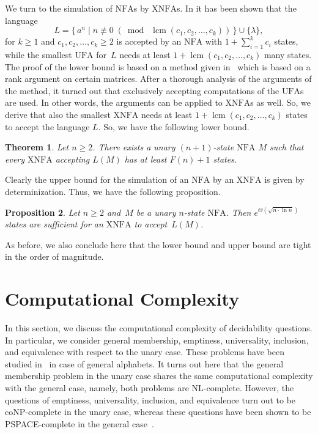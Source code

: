 \documentclass[final,copyright,noderivs]{eptcs}
\theoremstyle{plain}
\newtheorem{theorem}{Theorem}
\newtheorem{proposition}[theorem]{Proposition}
\theoremstyle{definition}
\DeclareMathOperator{\lcm}{lcm}
\newcommand{\ufa}{\textrm{UFA}}
\newcommand{\nfa}{\textrm{NFA}}
\newcommand{\xnfa}{\textrm{XNFA}}
\begin{document}
We turn to the simulation of $\nfa$s by $\xnfa$s.
In \cite{okhotin:2012:ufau} it has been shown that the language
$$
L=\{\, a^n\mid n\not\equiv 0\; (\bmod\; \lcm(c_1,c_2,\dots, c_k)) \,\}\cup \{\lambda\},
$$
for $k\ge 1$ and $c_1,c_2,\dots ,c_k\geq 2$ is accepted by
an $\nfa$ with $1+\sum_{i=1}^k c_i$ states, while the smallest $\ufa$ for~$L$
needs at least $1+\lcm (c_1,c_2,\dots ,c_k)$ many states.
The proof of the lower bound is based on a method given
in~\cite{schmidt:1978:sdcfrfl} which is based on a
rank argument on certain matrices. 
After a thorough analysis of the arguments of the method, it turned out that
exclusively accepting computations of the $\ufa$s are used. In other words, 
the arguments can be applied to $\xnfa$s as well.
So, we derive that also the smallest $\xnfa$ needs at
least $1+\lcm (c_1,c_2,\dots ,c_k)$ states to accept the language $L$. 
So, we have the following lower bound. 

\begin{theorem}\label{theo:nfaxnfalower:unary} 
Let $n\geq 2$. There exists a unary $(n+1)$-state $\nfa$ $M$ such that every 
$\xnfa$ accepting $L(M)$ has at least $F(n)+1$ states.
\end{theorem}

Clearly the upper bound for the simulation of an $\nfa$ by an $\xnfa$ is given
by determinization. 
Thus, we have the following proposition.

\begin{proposition}\label{prop:nfa-xnfa-lower:unary} 
Let $n\geq 2$ and~$M$ be a unary $n$-state $\nfa$.
Then $e^{\Theta(\sqrt{n\cdot\ln n})}$ states are sufficient 
for an $\xnfa$ to accept~$L(M)$. 
\end{proposition}

As before, we also conclude here that 
the lower bound and upper bound are tight in the order of magnitude.

\section{Computational Complexity}\label{sect:compcomp}

In this section, we discuss the computational complexity of
decidability questions. In particular, we consider general membership, emptiness, universality, inclusion,
and equivalence with respect to the unary case. These problems have been studied in~\cite{kutrib:2023:coenfa:proc,kutrib:2023:coenfa}
in case of general alphabets. It turns out here that the general membership problem
in the unary case shares the same computational complexity with the general case,
namely, both problems are {\sf NL}-complete.
However, the questions of emptiness, universality, inclusion, and equivalence
turn out to be {\sf coNP}-complete in the unary case, whereas these questions have
been shown to be {\sf PSPACE}-complete in the general case~\cite{kutrib:2023:coenfa:proc,kutrib:2023:coenfa}.
\end{document}
